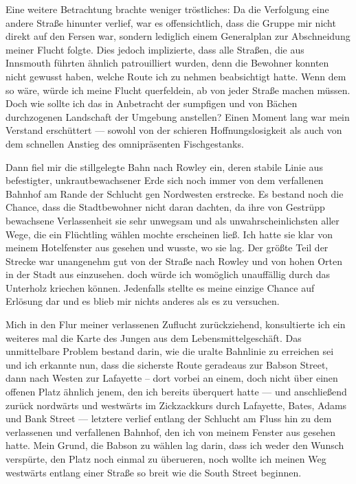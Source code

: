 Eine weitere Betrachtung brachte weniger tröstliches: Da die Verfolgung eine andere Straße hinunter verlief, war es offensichtlich, dass die Gruppe mir nicht direkt auf den Fersen war, sondern lediglich einem Generalplan zur Abschneidung meiner Flucht folgte. Dies jedoch implizierte, dass alle Straßen, die aus Innsmouth führten ähnlich patrouilliert wurden, denn die Bewohner konnten nicht gewusst haben, welche Route ich zu nehmen beabsichtigt hatte. Wenn dem so wäre, würde ich meine Flucht querfeldein, ab von jeder Straße machen müssen. Doch wie sollte ich das in Anbetracht der sumpfigen und von Bächen durchzogenen Landschaft der Umgebung anstellen? Einen Moment lang war mein Verstand erschüttert --- sowohl von der schieren Hoffnungslosigkeit als auch von dem schnellen Anstieg des omnipräsenten Fischgestanks.

Dann fiel mir die stillgelegte Bahn nach Rowley ein, deren stabile Linie aus befestigter, unkrautbewachsener Erde sich noch immer von dem verfallenen Bahnhof am Rande der Schlucht gen Nordwesten erstrecke. Es bestand noch die Chance, dass die Stadtbewohner nicht daran dachten, da ihre von Gestrüpp bewachsene Verlassenheit sie sehr unwegsam und als unwahrscheinlichsten aller Wege, die ein Flüchtling wählen mochte erscheinen ließ. Ich hatte sie klar von meinem Hotelfenster aus gesehen und wusste, wo sie lag. Der größte Teil der Strecke war unangenehm gut von der Straße nach Rowley und von hohen Orten in der Stadt aus einzusehen. doch würde ich womöglich unauffällig durch das Unterholz kriechen können. Jedenfalls stellte es meine einzige Chance auf Erlösung dar und es blieb mir nichts anderes als es zu versuchen.

Mich in den Flur meiner verlassenen Zuflucht zurückziehend, konsultierte ich ein weiteres mal die Karte des Jungen aus dem Lebensmittelgeschäft. Das unmittelbare Problem bestand darin, wie die uralte Bahnlinie zu erreichen sei und ich erkannte nun, dass die sicherste Route geradeaus zur Babson Street, dann nach Westen zur Lafayette -- dort vorbei an einem, doch nicht über einen offenen Platz ähnlich jenem, den ich bereits überquert hatte --- und anschließend zurück nordwärts und westwärts im Zickzackkurs durch Lafayette, Bates, Adams und Bank Street --- letztere verlief entlang der Schlucht am Fluss hin zu dem verlassenen und verfallenen Bahnhof, den ich von meinem Fenster aus gesehen hatte. Mein Grund, die Babson zu wählen lag darin, dass ich weder den Wunsch verspürte, den Platz noch einmal zu überueren, noch wollte ich meinen Weg westwärts entlang einer Straße so breit wie die South Street beginnen.

